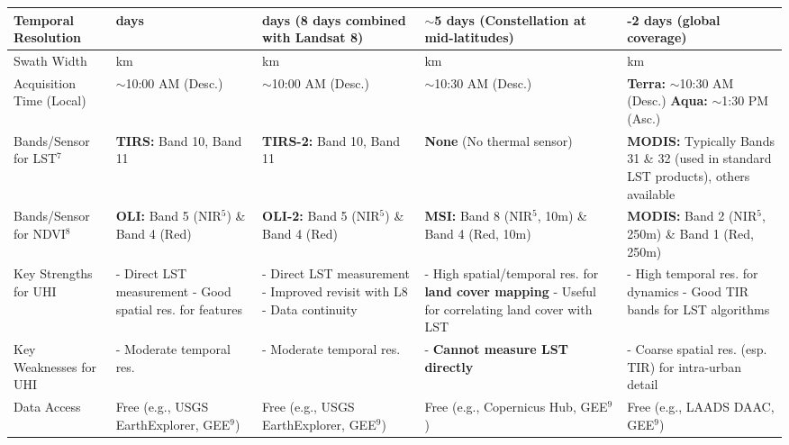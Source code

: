 \documentclass{article}
\begin{document}
\begin{minipage}{\textwidth}
{\begin{tabularx}{\textwidth}{| l | >{\RaggedRight\arraybackslash}X | >{\RaggedRight\arraybackslash}X | >{\RaggedRight\arraybackslash}X | >{\RaggedRight\arraybackslash}X |}
\hline
Temporal Resolution & 16 days & 16 days \newline (8 days combined with Landsat 8) & $\sim$5 days (Constellation at mid-latitudes) & 1-2 days (global coverage) \\
\hline
Swath Width & 185 km & 185 km & 290 km & 2330 km \\
\hline
Acquisition Time (Local) & $\sim$10:00 AM (Desc.) & $\sim$10:00 AM (Desc.) & $\sim$10:30 AM (Desc.) & \textbf{Terra:} $\sim$10:30 AM (Desc.) \newline \textbf{Aqua:} $\sim$1:30 PM (Asc.) \\
\hline
Bands/Sensor for LST$^7$ & \textbf{TIRS:} Band 10, Band 11 & \textbf{TIRS-2:} Band 10, Band 11 & \textbf{None} (No thermal sensor) & \textbf{MODIS:} Typically Bands 31 \& 32 (used in standard LST products), others available \\
\hline
Bands/Sensor for NDVI$^8$ & \textbf{OLI:} Band 5 (NIR$^5$) \& Band 4 (Red) & \textbf{OLI-2:} Band 5 (NIR$^5$) \& Band 4 (Red) & \textbf{MSI:} Band 8 (NIR$^5$, 10m) \& Band 4 (Red, 10m) & \textbf{MODIS:} Band 2 (NIR$^5$, 250m) \& Band 1 (Red, 250m) \\
\hline
Key Strengths for UHI & - Direct LST measurement \newline - Good spatial res. for features & - Direct LST measurement \newline - Improved revisit with L8 \newline - Data continuity & - High spatial/temporal res. for \textbf{land cover mapping} \newline - Useful for correlating land cover with LST & - High temporal res. for dynamics \newline - Good TIR bands for LST algorithms \\
\hline
Key Weaknesses for UHI & - Moderate temporal res. & - Moderate temporal res. & - \textbf{Cannot measure LST directly} & - Coarse spatial res. (esp. TIR) for intra-urban detail \\
\hline
Data Access & Free (e.g., USGS EarthExplorer, GEE$^9$)\cite{landsatUSGS,gee} & Free (e.g., USGS EarthExplorer, GEE$^9$)\cite{landsatUSGS,gee} & Free (e.g., Copernicus Hub, GEE$^9$)\cite{sentinelESA,gee} & Free (e.g., LAADS DAAC, GEE$^9$)\cite{modisNASA,gee} \\
\hline
\end{tabularx}
} %
\end{minipage} %
\end{document}
